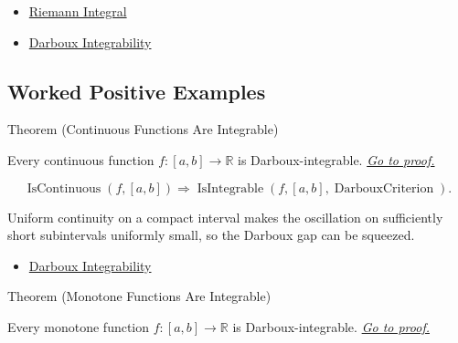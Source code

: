 \begin{dependencies}
\begin{itemize}
  \item \hyperref[def:riemann-integral]{Riemann Integral}
  \item \hyperref[def:darboux-integrability]{Darboux Integrability}
\end{itemize}
\end{dependencies}

\subsection*{Worked Positive Examples}

\begin{theorembox}{Theorem (Continuous Functions Are Integrable)}
\begin{theorem}
\label{thm:continuous-darboux-integrable}
Every continuous function \(f:[a,b]\to\mathbb R\) is Darboux-integrable.
\hyperref[prf:continuous-darboux-integrable]{\textit{Go to proof.}}
\end{theorem}
\end{theorembox}

\begin{remark*}
\[
\operatorname{IsContinuous}(f,[a,b])
\Longrightarrow
\operatorname{IsIntegrable}(f,[a,b],\operatorname{DarbouxCriterion}).
\]
\end{remark*}

\begin{remark*}[Interpretation]
Uniform continuity on a compact interval makes the oscillation on sufficiently
short subintervals uniformly small, so the Darboux gap can be squeezed.
\end{remark*}

\begin{dependencies}
\begin{itemize}
  \item \hyperref[def:darboux-integrability]{Darboux Integrability}
\end{itemize}
\end{dependencies}

\begin{theorembox}{Theorem (Monotone Functions Are Integrable)}
\begin{theorem}
\label{thm:monotone-darboux-integrable}
Every monotone function \(f:[a,b]\to\mathbb R\) is Darboux-integrable.
\hyperref[prf:monotone-darboux-integrable]{\textit{Go to proof.}}
\end{theorem}
\end{theorembox}

